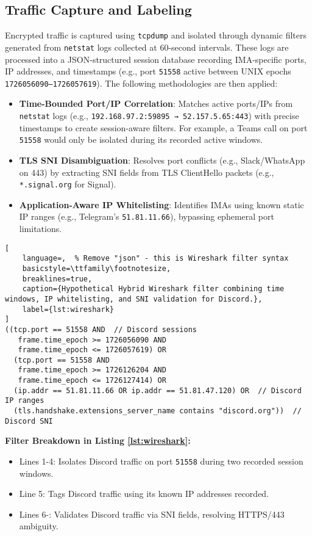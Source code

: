 \documentclass[conference]{IEEEtran}
\begin{document}
\subsection{Traffic Capture and Labeling}
Encrypted traffic is captured using \texttt{tcpdump} and isolated through dynamic filters generated from \texttt{netstat} logs collected at 60-second intervals. These logs are processed into a JSON-structured session database recording IMA-specific ports, IP addresses, and timestamps (e.g., port \texttt{51558} active between UNIX epochs \texttt{1726056090--1726057619}). The following methodologies are then applied:

\begin{itemize}
    \item \textbf{Time-Bounded Port/IP Correlation}: Matches active ports/IPs from \texttt{netstat} logs (e.g., \texttt{192.168.97.2:59895 → 52.157.5.65:443}) with precise timestamps to create session-aware filters. For example, a Teams call on port \texttt{51558} would only be isolated during its recorded active windows.
    
    \item \textbf{TLS SNI Disambiguation}: Resolves port conflicts (e.g., Slack/WhatsApp on 443) by extracting SNI fields from TLS ClientHello packets (e.g., \texttt{*.signal.org} for Signal).
    
    \item \textbf{Application-Aware IP Whitelisting}: Identifies IMAs using known static IP ranges (e.g., Telegram's \texttt{51.81.11.66}), bypassing ephemeral port limitations.
\end{itemize}

\begin{lstlisting}[
    language=,  % Remove "json" - this is Wireshark filter syntax
    basicstyle=\ttfamily\footnotesize,
    breaklines=true,
    caption={Hypothetical Hybrid Wireshark filter combining time windows, IP whitelisting, and SNI validation for Discord.},
    label={lst:wireshark}
]
((tcp.port == 51558 AND  // Discord sessions
   frame.time_epoch >= 1726056090 AND 
   frame.time_epoch <= 1726057619) OR
  (tcp.port == 51558 AND 
   frame.time_epoch >= 1726126204 AND 
   frame.time_epoch <= 1726127414) OR
  (ip.addr == 51.81.11.66 OR ip.addr == 51.81.47.120) OR  // Discord IP ranges
  (tls.handshake.extensions_server_name contains "discord.org"))  // Discord SNI
\end{lstlisting}

\textbf{Filter Breakdown in Listing \ref{lst:wireshark}:}
\begin{itemize}
    \item Lines 1-4: Isolates Discord traffic on port \texttt{51558} during two recorded session windows.
    \item Line 5: Tags Discord traffic using its known IP addresses recorded.
    \item Lines 6-: Validates Discord traffic via SNI fields, resolving HTTPS/443 ambiguity.
\end{itemize}
\end{document}
